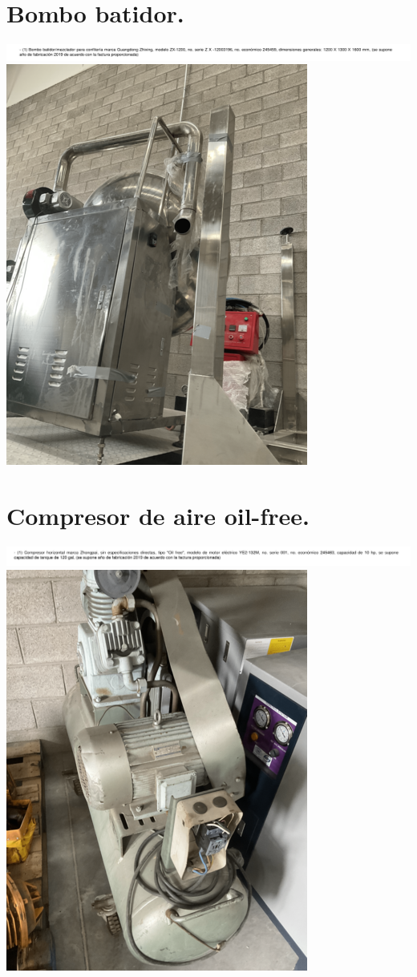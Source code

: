 \documentclass{article}
\begin{document}
\section{Bombo batidor.} %
\includegraphics[width=  \linewidth]{images/decript/7.png}
\includegraphics[width=  .5\linewidth]{images/foto/7.png}



\section{Compresor de aire oil-free.} %
\includegraphics[width=  \linewidth]{images/decript/8.png}
\includegraphics[width=  .5\linewidth]{images/foto/8.png}
\end{document}
